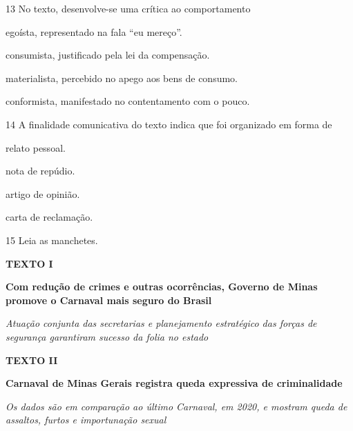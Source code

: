 \num{13} No texto, desenvolve-se uma crítica ao comportamento

\begin{escolha}
\item egoísta, representado na fala ``eu mereço''.

\item consumista, justificado pela lei da compensação.

\item materialista, percebido no apego aos bens de consumo.

\item conformista, manifestado no contentamento com o pouco.
\end{escolha}

\num{14} A finalidade comunicativa do texto indica que foi organizado em forma de

\begin{multicols}{2}
\begin{escolha}
\item relato pessoal.

\item nota de repúdio.

\item artigo de opinião.

\item carta de reclamação.
\end{escolha}
\end{multicols}

\num{15} Leia as manchetes.

\bigskip

\textbf{TEXTO I}

\begin{myquote}
\centering
\textbf{Com redução de crimes e outras ocorrências, Governo de Minas
promove o Carnaval mais seguro do Brasil}

\textit{Atuação conjunta das secretarias e planejamento estratégico das
forças de segurança garantiram sucesso da folia no estado}

\end{myquote}

\pagebreak

\textbf{TEXTO II}

\begin{myquote}
\centering
\textbf{Carnaval de Minas Gerais registra queda expressiva de
criminalidade}

\textit{Os dados são em comparação ao último Carnaval, em 2020, e mostram
queda de assaltos, furtos e importunação sexual}

\end{myquote}

